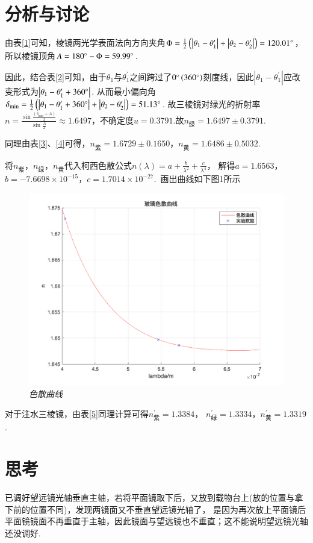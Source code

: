 \documentclass[a4paper]{article}%
\begin{document}
\section{分析与讨论}
由表\ref{1}可知，棱镜两光学表面法向方向夹角$\Phi =\frac{1}{2}\left(\left|\theta_1-\theta_1^\prime\right|+\left|\theta_2-\theta_2^\prime\right|\right)=120.01\degree$，
所以棱镜顶角$A=180\degree-\Phi=59.99\degree$.

因此，结合表\ref{2}可知，由于$\theta_1$与$\theta_1^\prime$之间跨过了$0\degree\left(360\degree\right)$刻度线，因此$\left|\theta_1-\theta_1^\prime\right|$应改变形式为$\left|\theta_1-\theta_1^\prime+360\degree\right|$.
从而最小偏向角$\delta_{\min} =\frac{1}{2}\left(\left|\theta_1-\theta_1^\prime+360\degree\right|+\left|\theta_2-\theta_2^\prime\right|\right)=51.13\degree$.
故三棱镜对绿光的折射率$n=\frac{\sin \frac{\left(\delta_{\min}+A\right)}{2}}{\sin\frac{A}{2}}\approx 1.6497$，不确定度$u=0.3791$.故$n_{\text{绿}}=1.6497\pm 0.3791$.

同理由表\ref{3}、\ref{4}可得，$n_{\text{紫}}=1.6729\pm 0.1650$，$n_{\text{黄}}=1.6486\pm 0.5032$.

将$n_{\text{紫}}$，$n_{\text{绿}}$，$n_{\text{黄}}$代入柯西色散公式$n\left(\lambda\right)=a+\frac{b}{\lambda^2}+\frac{c}{\lambda^4}$，
解得$a=1.6563$，$b=-7.6698\times 10^{-15}$，$c=1.7014\times 10^{-27}$.~画出曲线如下图1所示
\begin{figure}[H]
    \centering
    \includegraphics[scale=0.25]{色散曲线.png}
    \caption{\emph{色散曲线}}
\end{figure}

对于注水三棱镜，由表\ref{5}同理计算可得$n_{\text{紫}}^\prime=1.3384$，
$n_{\text{绿}}^\prime=1.3334$，$n_{\text{黄}}^\prime=1.3319$.

\section{思考}
已调好望远镜光轴垂直主轴，若将平面镜取下后，又放到载物台上(放的位置与拿下前的位置不同)，发现两镜面又不垂直望远镜光轴了，
是因为再次放上平面镜后平面镜镜面不再垂直于主轴，因此镜面与望远镜也不垂直；这不能说明望远镜光轴还没调好.~
\end{document}
